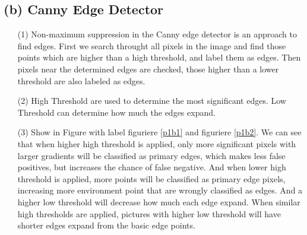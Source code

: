\documentclass[12pt]{article}
\begin{document}
\subsection*{(b) Canny Edge Detector}
	\begin{itemize}
	\item[(1)] Non-maximum suppression in the Canny edge detector is an approach to find edges. First we search throught all pixels in the image and find those points which are higher than a high threshold, and label them as edges. Then pixels near the determined edges are checked, those higher than a lower threshold are also labeled as edges. 
	
	\item[(2)] High Threshold are used to determine the most significant edges. Low Threshold can determine how much the edges expand.
	
	\item[(3)] Show in Figure with label figuriere \ref*{p1b1} and figuriere \ref*{p1b2}. We can see that when higher high threshold is applied, only more significant pixels with larger gradients will be classified as primary edges, which makes less false positives, but increases the chance of false negative. And when lower high threshold is applied, more points will be classified as primary edge pixels, increasing more environment point that are wrongly classified as edges. And a higher low threshold will decrease how much each edge expand. When similar high thresholds are applied, pictures with higher low threshold will have shorter edges expand from the basic edge points. 

	\end{itemize}
\end{document}
